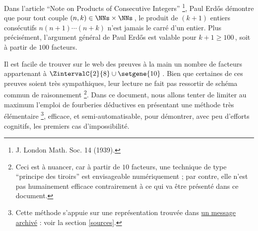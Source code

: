 Dans l'article \enquote{Note on Products of Consecutive Integers}
\footnote{
	J. London Math. Soc. 14 (1939).
},
Paul Erdős démontre que pour tout couple $(n, k) \in \NNs \times \NNs$\,, le produit de $(k+1)$ entiers consécutifs $n (n + 1) \cdots (n + k)$ n'est jamais le carré d'un entier.
Plus précisément, l'argument général de Paul Erdős est valable pour $k + 1 \geq 100$\,, soit à partir de $100$ facteurs.

\smallskip

Il est facile de trouver sur le web des preuves à la main un nombre de facteurs appartenant à $\ZintervalC{2}{8} \cup \setgene{10}$\,.
Bien que certaines de ces preuves soient très sympathiques, leur lecture ne fait pas ressortir de schéma commun de raisonnement
\footnote{
	Ceci est à nuancer, car à partir de $10$ facteurs, une technique de type \enquote{principe des tiroirs} est envisageable numériquement ; par contre, elle n'est pas humainement efficace contrairement à ce qui va être présenté dans ce document.
}.
%
Dans ce document, nous allons tenter de limiter au maximum l'emploi de fourberies déductives en présentant une méthode très élémentaire
\footnote{
	Cette méthode s'appuie sur une représentation trouvée dans \href{https://web.archive.org/web/20171110144534/http://mathforum.org/library/drmath/view/65589.html}{un message archivé} : voir la section \ref{sources}.
},
efficace, et semi-automatisable, pour démontrer, avec peu d'efforts cognitifs, les premiers cas d'impossibilité.
